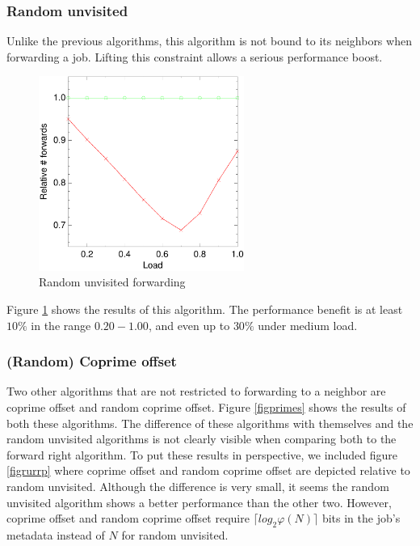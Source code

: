 \documentclass[10pt,a4paper]{article}
\begin{document}
\subsubsection*{Random unvisited}
Unlike the previous algorithms, this algorithm is not bound to its neighbors when forwarding a job. Lifting this constraint allows a serious performance boost.

\begin{figure}[h!tb]
\centering
\includegraphics[width=0.6\textwidth]{data/randunvisitedright.pdf}
\caption{Random unvisited forwarding}
\label{figrandunvisited}
\end{figure}

Figure \ref{figrandunvisited} shows the results of this algorithm. The performance benefit is at least $10 \%$ in the range $0.20 - 1.00$, and even up to $30 \%$ under medium load.

\subsubsection*{(Random) Coprime offset}
Two other algorithms that are not restricted to forwarding to a neighbor are coprime offset and random coprime offset. Figure \ref{figprimes} shows the results of both these algorithms. The difference of these algorithms with themselves and the random unvisited algorithms is not clearly visible when comparing both to the forward right algorithm. To put these results in perspective, we included figure \ref{figrurrp} where coprime offset and random coprime offset are depicted relative to random unvisited. Although the difference is very small, it seems the random unvisited algorithm shows a better performance than the other two. However, coprime offset and random coprime offset require $\lceil log_2 \varphi(N) \rceil$ bits in the job's metadata instead of $N$ for random unvisited.
\end{document}
